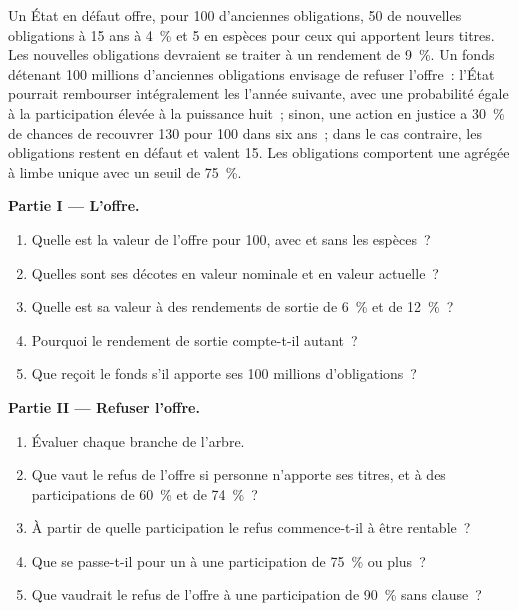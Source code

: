 \begin{problem}\label{pb:m2:distressed-sovereign-and-bank-capital-credit:1}
Un État en défaut offre, pour 100 d'anciennes obligations, 50 de nouvelles obligations à 15 ans à 4~\% et 5
en espèces pour ceux qui apportent leurs titres. Les nouvelles obligations devraient se traiter à un rendement de 9~\%. Un fonds
détenant 100 millions d'anciennes obligations envisage de refuser l'offre~: l'État pourrait rembourser
intégralement les  l'année suivante, avec une probabilité égale à la participation élevée à la
puissance huit~; sinon, une action en justice a 30~\% de chances de recouvrer 130 pour 100 dans six
ans~; dans le cas contraire, les obligations restent en défaut et valent 15. Les obligations comportent
une  agrégée à limbe unique avec un seuil de 75~\%.

\medskip\noindent\textbf{Partie I --- L'offre.}
\begin{enumerate}
\item Quelle est la valeur de l'offre pour 100, avec et sans les espèces~?
\item Quelles sont ses décotes en valeur nominale et en valeur actuelle~?
\item Quelle est sa valeur à des rendements de sortie de 6~\% et de 12~\%~?
\item Pourquoi le rendement de sortie compte-t-il autant~?
\item Que reçoit le fonds s'il apporte ses 100 millions d'obligations~?
\end{enumerate}

\medskip\noindent\textbf{Partie II --- Refuser l'offre.}
\begin{enumerate}[resume]
\item Évaluer chaque branche de l'arbre.
\item Que vaut le refus de l'offre si personne n'apporte ses titres, et à des participations de 60~\% et de 74~\%~?
\item À partir de quelle participation le refus commence-t-il à être rentable~?
\item Que se passe-t-il pour un  à une participation de 75~\% ou plus~?
\item Que vaudrait le refus de l'offre à une participation de 90~\% sans clause~?
\end{enumerate}


\end{problem}
